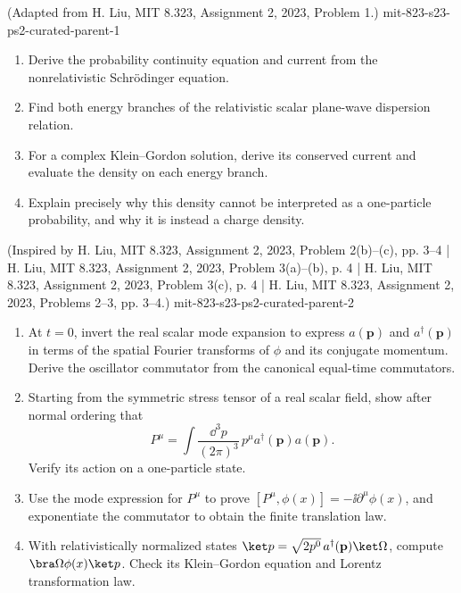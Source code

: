 
\begin{enumerate}
  {(Adapted from H. Liu, MIT 8.323, Assignment 2, 2023, Problem 1.)}
  {mit-823-s23-ps2-curated-parent-1}
\begin{enumerate}
\item Derive the probability continuity equation and current from the
nonrelativistic Schrödinger equation.
\item Find both energy branches of the relativistic scalar plane-wave
dispersion relation.
\item For a complex Klein--Gordon solution, derive its conserved current
and evaluate the density on each energy branch.
\item Explain precisely why this density cannot be interpreted as a
one-particle probability, and why it is instead a charge density.
\end{enumerate}

  {(Inspired by H. Liu, MIT 8.323, Assignment 2, 2023, Problem 2(b)--(c), pp. 3--4 | H. Liu, MIT 8.323, Assignment 2, 2023, Problem 3(a)--(b), p. 4 | H. Liu, MIT 8.323, Assignment 2, 2023, Problem 3(c), p. 4 | H. Liu, MIT 8.323, Assignment 2, 2023, Problems 2--3, pp. 3--4.)}
  {mit-823-s23-ps2-curated-parent-2}
\begin{enumerate}
\item
At \(t=0\), invert the real scalar mode expansion to express
\(a(\mathbf p)\) and \(a^\dagger(\mathbf p)\) in terms of the spatial
Fourier transforms of \(\phi\) and its conjugate momentum.  Derive the
oscillator commutator from the canonical equal-time commutators.
\item
Starting from the symmetric stress tensor of a real scalar field, show after
normal ordering that
\[
 P^\mu=\int\frac{\dd^3p}{(2\pi)^3}\,
 p^\mu a^\dagger(\mathbf p)a(\mathbf p).
\]
Verify its action on a one-particle state.
\item
Use the mode expression for \(P^\mu\) to prove
\([P^\mu,\phi(x)]=-\ii\partial^\mu\phi(x)\), and exponentiate the
commutator to obtain the finite translation law.
\item
With relativistically normalized states
\(\ket p=\sqrt{2p^0}\,a^\dagger(\mathbf p)\ket\Omega\), compute
\(\bra\Omega\phi(x)\ket p\).  Check its Klein--Gordon equation and
Lorentz transformation law.
\end{enumerate}


\end{enumerate}
